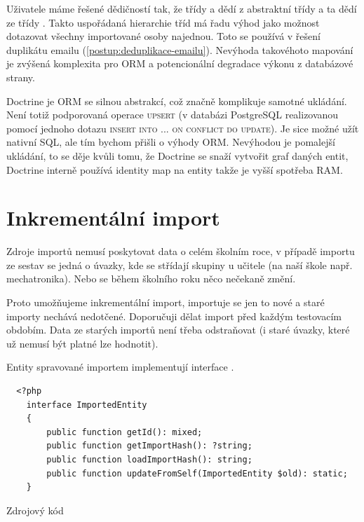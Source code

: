 Uživatele máme řešené dědičností tak, že třídy  a  dědí z abstraktní třídy  a ta dědí ze třídy . Takto uspořádaná hierarchie tříd má řadu výhod jako možnost dotazovat všechny importované osoby najednou.   Toto se používá v řešení duplikátu emailu (\ref{postup:deduplikace-emailu}). Nevýhoda takovéhoto mapování je zvýšená komplexita pro ORM a potencionální degradace výkonu z databázové strany.

Doctrine je ORM se silnou abstrakcí, což značně komplikuje samotné ukládání. Není totiž podporovaná operace \textsc{upsert} (v databázi PostgreSQL realizovanou pomocí jednoho dotazu \textsc{insert into ... on conflict do update}). Je sice možné užít nativní SQL, ale tím bychom přišli o výhody ORM.
Nevýhodou je pomalejší ukládání, to se děje kvůli tomu, že Doctrine se snaží vytvořit graf daných entit, Doctrine interně používá identity map na entity takže je vyšší spotřeba RAM.



\section{Inkrementální import}

Zdroje importů nemusí poskytovat data o celém školním roce, v případě importu ze sestav se jedná o úvazky, kde se střídají skupiny u učitele (na naší škole např. mechatronika).
 Nebo se během školního roku něco nečekaně změní.

Proto umožňujeme inkrementální import, importuje se jen to nové a staré importy nechává nedotčené. Doporučuji dělat import před každým testovacím obdobím. Data ze starých importů není třeba odstraňovat (i staré úvazky, které už nemusí být platné lze hodnotit). 

Entity spravované importem implementují interface .

\begin{code}[H]
\begin{verbatim}
  <?php
    interface ImportedEntity
    {
        public function getId(): mixed;
        public function getImportHash(): ?string;   
        public function loadImportHash(): string;   
        public function updateFromSelf(ImportedEntity $old): static;
    }
\end{verbatim}
\caption{Zdrojový kód }
\end{code}

